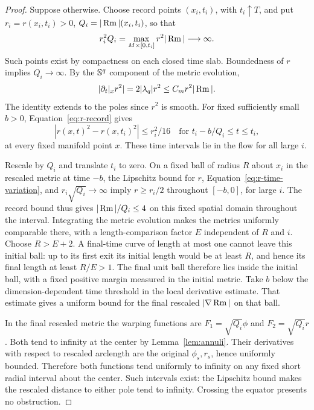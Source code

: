 \begin{proof}
Suppose otherwise. Choose record points \((x_i,t_i)\), with \(t_i\uparrow T\),
and put \(r_i=r(x_i,t_i)>0\), \(Q_i=|\operatorname{Rm}|(x_i,t_i)\), so that
\begin{equation}\label{eq:r-record}
r_i^2Q_i=\max_{M\times[0,t_i]}r^2|\operatorname{Rm}|\longrightarrow\infty.
\end{equation}
Such points exist by compactness on each closed time slab. Boundedness of
\(r\) implies \(Q_i\to\infty\). By the \(\mathbb S^q\) component of the
metric evolution,
\[
|\partial_t|_x r^2|=2|\lambda_q|r^2\le C_mr^2|\operatorname{Rm}|.
\]
The identity extends to the poles since \(r^2\) is smooth. For fixed
sufficiently small \(b>0\), Equation~\eqref{eq:r-record} gives
\begin{equation}\label{eq:r-time-variation}
|r(x,t)^2-r(x,t_i)^2|\le r_i^2/16
\quad\text{for }t_i-b/Q_i\le t\le t_i,
\end{equation}
at every fixed manifold point \(x\). These time intervals lie in the
flow for all large \(i\).

Rescale by \(Q_i\) and translate \(t_i\) to zero. On a fixed ball of
radius \(R\) about \(x_i\) in the rescaled metric at time \(-b\), the
Lipschitz bound for \(r\), Equation~\eqref{eq:r-time-variation}, and
\(r_i\sqrt{Q_i}\to\infty\) imply \(r\ge r_i/2\) throughout
\([-b,0]\), for large \(i\). The record bound thus gives
\(|\operatorname{Rm}|/Q_i\le4\) on this fixed spatial domain throughout the interval.
Integrating the metric evolution makes the metrics uniformly comparable
there, with a length-comparison factor \(E\) independent of \(R\) and \(i\).
Choose \(R>E+2\). A final-time curve of length at most one cannot leave
this initial ball: up to its first exit its initial length would be at
least \(R\), and hence its final length at least \(R/E>1\).
The final unit ball therefore lies inside the initial ball, with a fixed
positive margin measured in the initial metric. Take \(b\) below the
dimension-dependent time threshold in the local derivative estimate.
That estimate gives a uniform
bound for the final rescaled \(|\nabla\operatorname{Rm}|\) on that ball.

In the final rescaled metric the warping functions are
\(F_1=\sqrt{Q_i}\phi\) and \(F_2=\sqrt{Q_i}r\). Both tend to infinity
at the center by Lemma~\ref{lem:annuli}. Their derivatives with respect
to rescaled arclength are the original \(\phi_s,r_s\), hence uniformly
bounded. Therefore both functions tend uniformly to infinity on any fixed
short radial interval about the center. Such intervals exist: the
Lipschitz bound makes the rescaled distance to either pole tend to
infinity. Crossing the equator presents no obstruction.


\end{proof}
